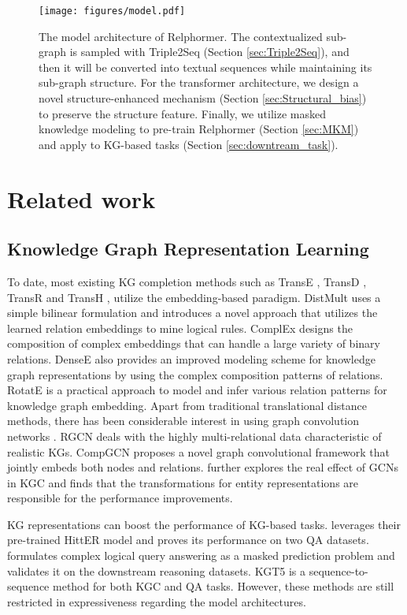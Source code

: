 \documentclass[sigconf]{acmart}
\begin{document}
\begin{figure*}[!t]
\centering

\texttt{[image: figures/model.pdf]}
\caption{
The model architecture of Relphormer. 
The contextualized sub-graph is sampled with Triple2Seq (Section \ref{sec:Triple2Seq}), and then it will be converted into textual sequences while maintaining its sub-graph structure.
For the transformer architecture, we design a novel structure-enhanced mechanism (Section \ref{sec:Structural_bias}) to preserve the structure feature.
Finally, we utilize masked knowledge modeling to pre-train Relphormer (Section \ref{sec:MKM}) and apply to KG-based tasks (Section \ref{sec:downtream_task}). 
}
\label{arc}
\end{figure*}



\section{Related work}
\subsection{Knowledge Graph Representation Learning}
To date, most existing KG completion methods such as TransE \cite{TransE}, TransD \cite{TransD}, TransR \cite{TransR} and TransH \cite{TransH}, utilize the embedding-based paradigm.
DistMult \cite{DistMult} uses a simple bilinear formulation and introduces a novel approach that utilizes the learned relation embeddings to mine logical rules.
ComplEx \cite{ComplEx} designs the composition of complex embeddings that can handle a large variety of binary relations.
DenseE \cite{DenseE} also provides an improved modeling scheme for knowledge graph representations by using the complex composition patterns of relations.
RotatE \cite{RotatE} is a practical approach to model and infer various relation patterns for knowledge graph embedding.
Apart from traditional translational distance methods, there has been considerable interest in using graph convolution networks \cite{GCN, GAT}. 
RGCN \cite{RGCN} deals with the highly multi-relational data characteristic of realistic KGs.
CompGCN \cite{CompGCN} proposes a novel graph convolutional framework that jointly embeds both nodes and relations.
\cite{DBLP:conf/www/Zhang0YW22} further explores the real effect of GCNs in KGC and finds that the transformations for entity representations are responsible for the performance improvements.

KG representations can boost the performance of KG-based tasks.
\cite{HittER} leverages their pre-trained HittER model and proves its performance on two QA datasets.
\cite{kgTransformer} formulates complex logical query answering as a masked prediction problem and validates it on the downstream reasoning datasets.
KGT5 \cite{KGT5} is a sequence-to-sequence method for both KGC and QA tasks.
However, these methods are still restricted in expressiveness regarding the model architectures.
\end{document}

